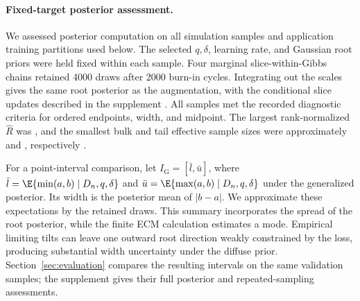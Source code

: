 \paragraph{Fixed-target posterior assessment.}
We assessed posterior computation on all \MTIFullSimulations{} simulation
samples and \MTIFullApplications{} application training partitions used below.
The selected \(q,\delta\), learning rate, and Gaussian root priors were held
fixed within each sample. Four marginal slice-within-Gibbs chains retained
4000 draws after 2000 burn-in cycles. Integrating out the scales gives the
same root posterior as the augmentation, with the conditional slice updates
described in the supplement \citep{Neal2003SliceSampling}.
All \MTIFullDatasets{} samples met the recorded diagnostic criteria for
ordered endpoints, width, and midpoint. The largest rank-normalized
\(\widehat R\) was \MTIFullRhat{}, and the smallest bulk and tail effective
sample sizes were approximately \MTIFullBulkESS{} and \MTIFullTailESS{},
respectively \citep{VehtariEtAl2021Rhat}.

For a point-interval comparison, let
\(I_{\mathrm G}=[\bar l,\bar u]\), where
\(\bar l=\E\{\min(a,b)\mid D_n,q,\delta\}\) and
\(\bar u=\E\{\max(a,b)\mid D_n,q,\delta\}\) under the generalized posterior.
Its width is the posterior mean of \(|b-a|\). We approximate these expectations
by the retained draws. This summary incorporates the spread of the root
posterior, while the finite ECM calculation estimates a mode. Empirical
limiting tilts can leave one outward root direction weakly constrained by
the loss, producing substantial width uncertainty under the diffuse prior.
Section~\ref{sec:evaluation} compares the resulting intervals on the same
validation samples; the supplement gives their full posterior and
repeated-sampling assessments.
